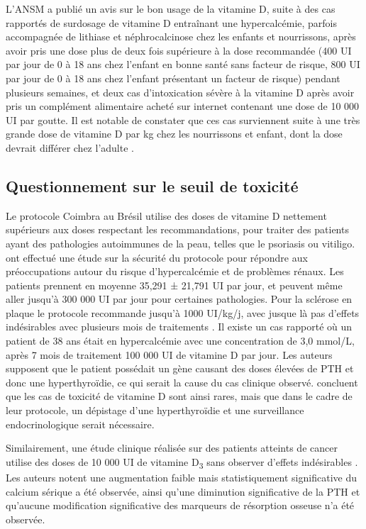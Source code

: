 \documentclass[
  a4paper,
  DIV=11,
  numbers=noendperiod,
  listof=totoc]{scrreprt}
\begin{document}
L'\ac{ANSM} a publié un avis sur le bon usage de la vitamine D, suite à
des cas rapportés de surdosage de vitamine D entraînant une
hypercalcémie, parfois accompagnée de lithiase et néphrocalcinose chez
les enfants et nourrissons, après avoir pris une dose plus de deux fois
supérieure à la dose recommandée (400 UI par jour de 0 à 18 ans chez
l'enfant en bonne santé sans facteur de risque, 800 UI par jour de 0 à
18 ans chez l'enfant présentant un facteur de risque) pendant plusieurs
semaines, et deux cas d'intoxication sévère à la vitamine D après avoir
pris un complément alimentaire acheté sur internet contenant une dose de
10 000 UI par goutte. Il est notable de constater que ces cas
surviennent suite à une très grande dose de vitamine D par kg chez les
nourrissons et enfant, dont la dose devrait différer chez l'adulte
\autocite{ANSM.2021}.

\subsection{Questionnement sur le seuil de
toxicité}\label{questionnement-sur-le-seuil-de-toxicituxe9}

Le protocole Coimbra au Brésil utilise des doses de vitamine D nettement
supérieurs aux doses respectant les recommandations, pour traiter des
patients ayant des pathologies autoimmunes de la peau, telles que le
psoriasis ou vitiligo. \textcite{Amon.2022} ont effectué une étude sur
la sécurité du protocole pour répondre aux préoccupations autour du
risque d'hypercalcémie et de problèmes rénaux. Les patients prennent en
moyenne 35,291 ± 21,791 UI par jour, et peuvent même aller jusqu'à 300
000 UI par jour pour certaines pathologies. Pour la sclérose en plaque
le protocole recommande jusqu'à 1000 UI/kg/j, avec jusque là pas
d'effets indésirables avec plusieurs mois de traitements
\autocite{Lemke.2021}. Il existe un cas rapporté où un patient de 38 ans
était en hypercalcémie avec une concentration de 3,0 mmol/L, après 7
mois de traitement 100 000 UI de vitamine D par jour. Les auteurs
supposent que le patient possédait un gène causant des doses élevées de
\ac{PTH} et donc une hyperthyroïdie, ce qui serait la cause du cas
clinique observé. \textcite{Lemke.2021} concluent que les cas de
toxicité de vitamine D sont ainsi rares, mais que dans le cadre de leur
protocole, un dépistage d'une hyperthyroïdie et une surveillance
endocrinologique serait nécessaire.

Similairement, une étude clinique réalisée sur des patients atteints de
cancer utilise des doses de 10 000 UI de vitamine D\textsubscript{3}
sans observer d'effets indésirables \autocite{Amir.2010}. Les auteurs
notent une augmentation faible mais statistiquement significative du
calcium sérique a été observée, ainsi qu'une diminution significative de
la \ac{PTH} et qu'aucune modification significative des marqueurs de
résorption osseuse n'a été observée.
\end{document}
